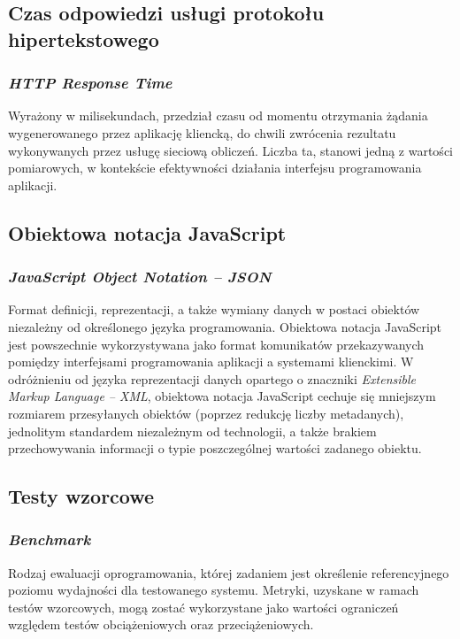 \subsection*{Czas odpowiedzi usługi protokołu hipertekstowego}
\subsubsection{\textit{HTTP Response Time}}
Wyrażony w milisekundach, przedział czasu od momentu otrzymania żądania wygenerowanego przez aplikację kliencką, do chwili zwrócenia rezultatu wykonywanych przez usługę sieciową obliczeń. Liczba ta, stanowi jedną z wartości pomiarowych, w kontekście efektywności działania interfejsu programowania aplikacji.  

\subsection*{Obiektowa notacja JavaScript}
\subsubsection{\textit{JavaScript Object Notation -- JSON}}
Format definicji, reprezentacji, a także wymiany danych w postaci obiektów niezależny od określonego języka programowania. Obiektowa notacja JavaScript jest powszechnie wykorzystywana jako format komunikatów przekazywanych pomiędzy interfejsami programowania aplikacji a systemami klienckimi. W odróżnieniu od języka reprezentacji danych opartego o znaczniki \textit{Extensible Markup Language -- XML}, obiektowa notacja JavaScript cechuje się mniejszym rozmiarem przesyłanych obiektów (poprzez redukcję liczby metadanych), jednolitym standardem niezależnym od technologii, a także brakiem przechowywania informacji o typie poszczególnej wartości zadanego obiektu.

\subsection*{Testy wzorcowe}
\subsubsection{\textit{Benchmark}}
Rodzaj ewaluacji oprogramowania, której zadaniem jest określenie referencyjnego poziomu wydajności dla testowanego systemu. Metryki, uzyskane w ramach testów wzorcowych, mogą zostać wykorzystane jako wartości ograniczeń względem testów obciążeniowych oraz przeciążeniowych. 

